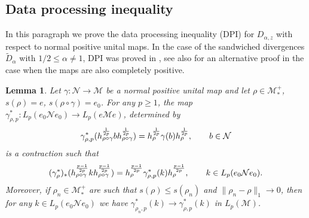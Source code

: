 \documentclass[12pt]{article}
\newtheorem{lemma}[theorem]{Lemma}
\theoremstyle{definition}
\theoremstyle{remark}
\numberwithin{equation}{section}
\def\Me{\mathcal M}
\def\Ne{\mathcal N}
\begin{document}
\subsection{Data processing inequality}


In this paragraph we prove the data processing inequality (DPI) for $D_{\alpha,z}$ with respect to normal
positive unital maps. In the case of the sandwiched divergences $\tilde D_\alpha$ with
$1/2\le \alpha \ne 1$, DPI was proved in \cite{jencova2018renyi,
jencova2021renyi}, see also \cite{berta2018renyi} for an alternative proof in the case
when the maps are  also completely positive.


\begin{lemma}\label{lemma:pcontraction} Let $\gamma:\Ne\to \Me$ be a normal positive unital map and
let $\rho\in \Me_*^+$, $s(\rho)=e$, $s(\rho\circ\gamma)=e_0$.
For any $p\ge 1$, the map $\gamma^*_{\rho,p}:L_p(e_0 \Ne e_0)\to L_p(e\Me e)$, determined
by
\[
\gamma^*_{\rho,p}(h_{\rho\circ\gamma}^{1\over 2p}bh^{1\over
2p}_{\rho\circ\gamma})=h_\rho^{1\over 2p}\gamma(b) h_\rho^{1\over 2p},\qquad b\in \Ne
\]
is a contraction such that 
\[
(\gamma^*_\rho)_*(h_{\rho\circ\gamma}^{p-1\over 2p}kh_{\rho\circ\gamma}^{p-1\over
2p})=h_\rho^{p-1\over 2p}\gamma^*_{\rho,p}(k)h_\rho^{p-1\over 2p},\qquad k\in L_p(e_0 \Ne
e_0).
\]
Moreover, if $\rho_n\in \Me_*^+$ are such that $s(\rho)\le s(\rho_n)$ and
$\|\rho_n-\rho\|_1\to 0$, then for any $k\in L_p(e_0 \Ne e_0)$ we have
$\gamma^*_{\rho_n,p}(k)\to \gamma^*_{\rho,p}(k)$ in $L_p(\Me)$.

\end{lemma}
\end{document}
